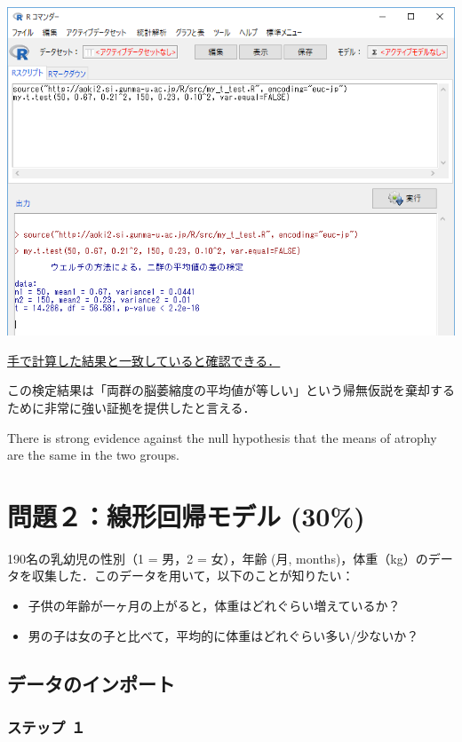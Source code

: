 \documentclass[]{problemset}
\begin{document}
\begin{center}\includegraphics[width=0.9\linewidth]{pic/myttest02} \end{center}
\bigskip

\underline{手で計算した結果と一致していると確認できる．}

この検定結果は「両群の脳萎縮度の平均値が等しい」という帰無仮説を棄却するために非常に強い証拠を提供したと言える．

There is strong evidence against the null hypothesis that the means of
atrophy are the same in the two groups.

\newpage
\vfill

\hypertarget{-30}{%
\section{問題２：線形回帰モデル (30\%)}\label{-30}}

190名の乳幼児の性別（1 = 男，2 = 女），年齢 (月,
months)，体重（kg）のデータを収集した．このデータを用いて，以下のことが知りたい：

\begin{itemize}
\item
  子供の年齢が一ヶ月の上がると，体重はどれぐらい増えているか？
\item
  男の子は女の子と比べて，平均的に体重はどれぐらい多い/少ないか？
\end{itemize}

\subsection{データのインポート}

\subsubsection{ステップ １}
\end{document}
